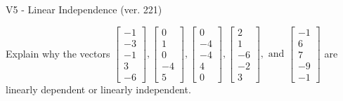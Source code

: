\begin{exercise}
  \begin{exerciseTitle}V5 - Linear Independence (ver. 221)\end{exerciseTitle}
  \begin{exerciseStatement}
    Explain why the vectors \(\left[\begin{array}{r}
-1 \\
-3 \\
-1 \\
3 \\
-6
\end{array}\right] , \left[\begin{array}{r}
0 \\
1 \\
0 \\
-4 \\
5
\end{array}\right] , \left[\begin{array}{r}
0 \\
-4 \\
-4 \\
4 \\
0
\end{array}\right] , \left[\begin{array}{r}
2 \\
1 \\
-6 \\
-2 \\
3
\end{array}\right] , \text{ and } \left[\begin{array}{r}
-1 \\
6 \\
7 \\
-9 \\
-1
\end{array}\right]\) are linearly dependent or linearly independent.	



\end{exerciseStatement}
\end{exercise}
